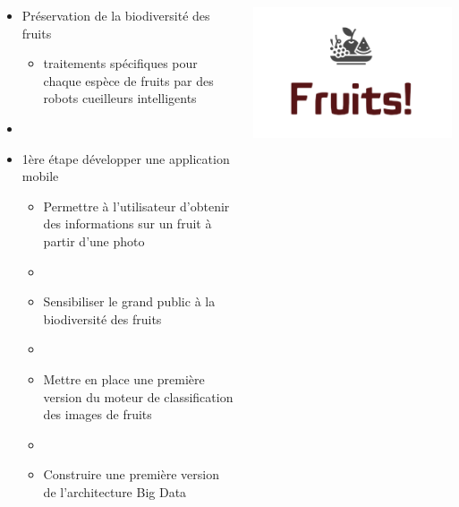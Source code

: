 \documentclass[8pt,aspectratio=169,hyperref={unicode=true}]{beamer}
\begin{document}
\begin{frame}{\insertsubsection}
  \begin{columns}
    \begin{column}{.6\textwidth}
      \begin{itemize}
        \item Préservation de la biodiversité des fruits
              \begin{itemize}
                \item traitements spécifiques pour chaque espèce de fruits par des robots cueilleurs intelligents
              \end{itemize}
        \item[]
        \item 1ère étape développer une application mobile
              \begin{itemize}
                \item Permettre à l'utilisateur d'obtenir des informations sur un fruit à partir d'une photo
                \item[]
                \item Sensibiliser le grand public à la biodiversité des fruits
                \item[]
                \item Mettre en place une première version du moteur de classification des images de fruits
                \item[]
                \item Construire une première version de l'architecture Big Data
              \end{itemize}
      \end{itemize}

    \end{column}
    \begin{column}{.4\textwidth}
      \includegraphics[width=\textwidth]{./Logo projet big data.png}
    \end{column}
  \end{columns}
\end{frame}
\end{document}

